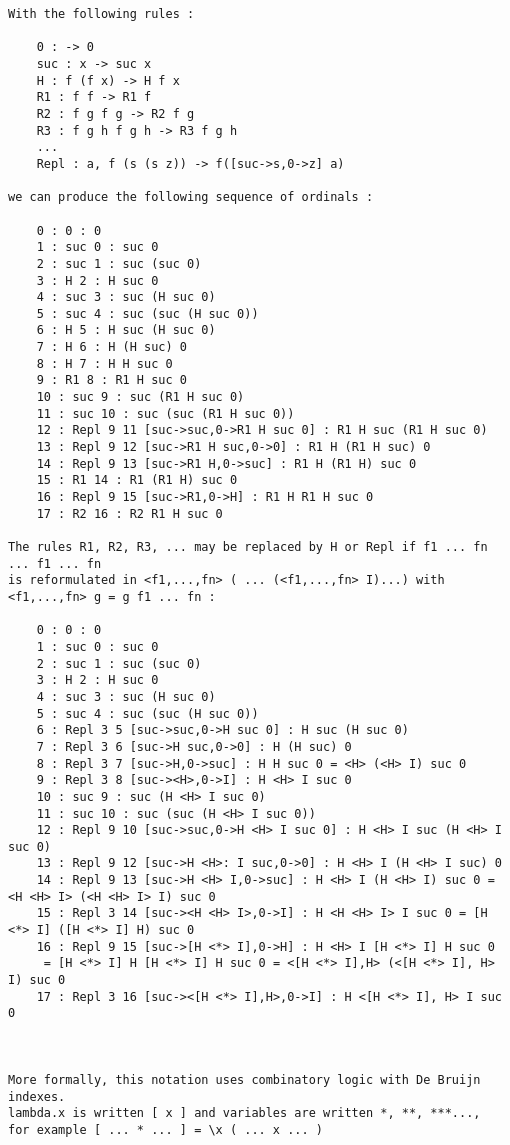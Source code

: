 \documentclass[10pt]{article}
\begin{document}
\begin{verbatim}
With the following rules :

    0 : -> 0
    suc : x -> suc x
    H : f (f x) -> H f x
    R1 : f f -> R1 f
    R2 : f g f g -> R2 f g
    R3 : f g h f g h -> R3 f g h
    ...
    Repl : a, f (s (s z)) -> f([suc->s,0->z] a) 

we can produce the following sequence of ordinals :

    0 : 0 : 0
    1 : suc 0 : suc 0
    2 : suc 1 : suc (suc 0)
    3 : H 2 : H suc 0
    4 : suc 3 : suc (H suc 0)
    5 : suc 4 : suc (suc (H suc 0))
    6 : H 5 : H suc (H suc 0)
    7 : H 6 : H (H suc) 0
    8 : H 7 : H H suc 0
    9 : R1 8 : R1 H suc 0
    10 : suc 9 : suc (R1 H suc 0)
    11 : suc 10 : suc (suc (R1 H suc 0))
    12 : Repl 9 11 [suc->suc,0->R1 H suc 0] : R1 H suc (R1 H suc 0)
    13 : Repl 9 12 [suc->R1 H suc,0->0] : R1 H (R1 H suc) 0
    14 : Repl 9 13 [suc->R1 H,0->suc] : R1 H (R1 H) suc 0
    15 : R1 14 : R1 (R1 H) suc 0
    16 : Repl 9 15 [suc->R1,0->H] : R1 H R1 H suc 0
    17 : R2 16 : R2 R1 H suc 0 

The rules R1, R2, R3, ... may be replaced by H or Repl if f1 ... fn ... f1 ... fn 
is reformulated in <f1,...,fn> ( ... (<f1,...,fn> I)...) with <f1,...,fn> g = g f1 ... fn :

    0 : 0 : 0
    1 : suc 0 : suc 0
    2 : suc 1 : suc (suc 0)
    3 : H 2 : H suc 0
    4 : suc 3 : suc (H suc 0)
    5 : suc 4 : suc (suc (H suc 0))
    6 : Repl 3 5 [suc->suc,0->H suc 0] : H suc (H suc 0)
    7 : Repl 3 6 [suc->H suc,0->0] : H (H suc) 0
    8 : Repl 3 7 [suc->H,0->suc] : H H suc 0 = <H> (<H> I) suc 0
    9 : Repl 3 8 [suc-><H>,0->I] : H <H> I suc 0
    10 : suc 9 : suc (H <H> I suc 0)
    11 : suc 10 : suc (suc (H <H> I suc 0))
    12 : Repl 9 10 [suc->suc,0->H <H> I suc 0] : H <H> I suc (H <H> I suc 0)
    13 : Repl 9 12 [suc->H <H>: I suc,0->0] : H <H> I (H <H> I suc) 0
    14 : Repl 9 13 [suc->H <H> I,0->suc] : H <H> I (H <H> I) suc 0 = <H <H> I> (<H <H> I> I) suc 0
    15 : Repl 3 14 [suc-><H <H> I>,0->I] : H <H <H> I> I suc 0 = [H <*> I] ([H <*> I] H) suc 0
    16 : Repl 9 15 [suc->[H <*> I],0->H] : H <H> I [H <*> I] H suc 0 
     = [H <*> I] H [H <*> I] H suc 0 = <[H <*> I],H> (<[H <*> I], H> I) suc 0
    17 : Repl 3 16 [suc-><[H <*> I],H>,0->I] : H <[H <*> I], H> I suc 0 



More formally, this notation uses combinatory logic with De Bruijn indexes.
lambda.x is written [ x ] and variables are written *, **, ***..., 
for example [ ... * ... ] = \x ( ... x ... ) 


\end{verbatim}
\end{document}
